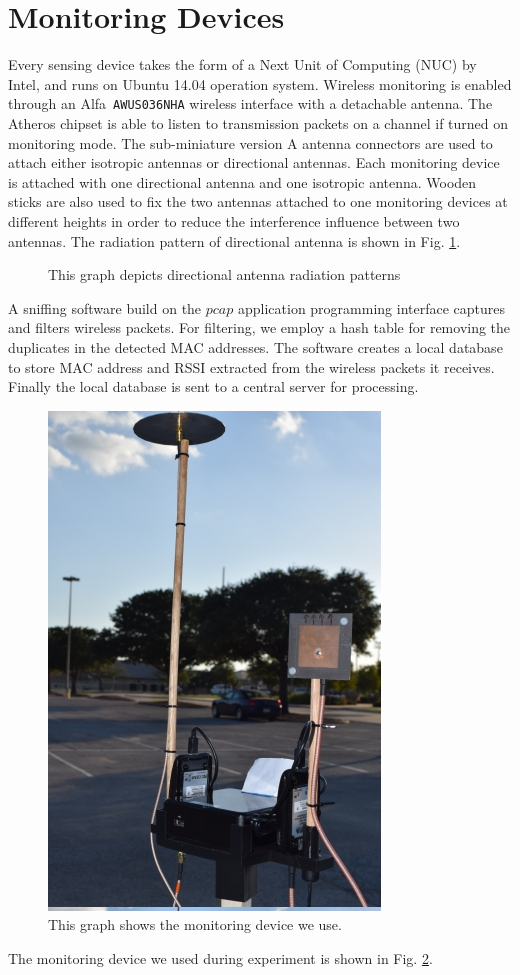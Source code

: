 \section{Monitoring Devices}
Every sensing device takes the form of a Next Unit of Computing (NUC) by Intel{\texttrademark}, and runs on Ubuntu 14.04 operation system. Wireless monitoring is enabled through an Alfa{\texttrademark}~\texttt{AWUS036NHA} wireless interface with a detachable antenna.
The Atheros{\texttrademark} chipset is able to listen to transmission packets on a channel if turned on monitoring mode. The sub-miniature version A antenna connectors are used to attach either isotropic antennas or directional antennas. Each monitoring device is attached with one directional antenna and one isotropic antenna. Wooden sticks are also used to fix the two antennas attached to one monitoring devices at different heights in order to reduce the interference influence between two antennas. The radiation pattern of directional antenna is shown in Fig. \ref{figure:Directionalantenna}.
\begin{figure}[t]
	\centerline{}
	\caption{This graph depicts directional antenna radiation patterns}
	\label{figure:Directionalantenna}
\end{figure}
A sniffing software build on the $pcap$ application programming interface captures and filters wireless packets.
For filtering, we employ a hash table for removing the duplicates in the detected MAC addresses. 
The software creates a local database to store MAC address and RSSI extracted from the wireless packets it receives. Finally the local database is sent to a central server for processing.
\begin{figure}[]
	\centering
	\includegraphics[scale=0.5]{Figures/DeviceSetup.jpg}
	\caption{This graph shows the monitoring device we use. }
	\label{figure: Device}
\end{figure}
The monitoring device we used during experiment is shown in Fig. \ref{figure: Device}.


